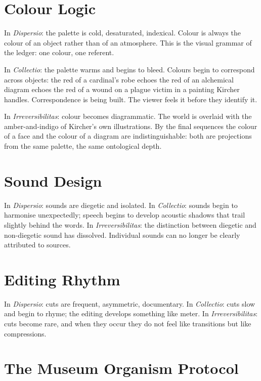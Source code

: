 \documentclass[12pt, a4paper, twoside]{memoir}
\theoremstyle{definition}
\theoremstyle{remark}
\begin{document}
\section*{Colour Logic}

In \textit{Dispersio}: the palette is cold, desaturated, indexical. Colour is always the colour of an object rather than of an atmosphere. This is the visual grammar of the ledger: one colour, one referent.

In \textit{Collectio}: the palette warms and begins to bleed. Colours begin to correspond across objects: the red of a cardinal's robe echoes the red of an alchemical diagram echoes the red of a wound on a plague victim in a painting Kircher handles. Correspondence is being built. The viewer feels it before they identify it.

In \textit{Irreversibilitas}: colour becomes diagrammatic. The world is overlaid with the amber-and-indigo of Kircher's own illustrations. By the final sequences the colour of a face and the colour of a diagram are indistinguishable: both are projections from the same palette, the same ontological depth.

\section*{Sound Design}

In \textit{Dispersio}: sounds are diegetic and isolated. In \textit{Collectio}: sounds begin to harmonise unexpectedly; speech begins to develop acoustic shadows that trail slightly behind the words. In \textit{Irreversibilitas}: the distinction between diegetic and non-diegetic sound has dissolved. Individual sounds can no longer be clearly attributed to sources.

\section*{Editing Rhythm}

In \textit{Dispersio}: cuts are frequent, asymmetric, documentary. In \textit{Collectio}: cuts slow and begin to rhyme; the editing develops something like meter. In \textit{Irreversibilitas}: cuts become rare, and when they occur they do not feel like transitions but like compressions.

\section*{The Museum Organism Protocol}
\end{document}
